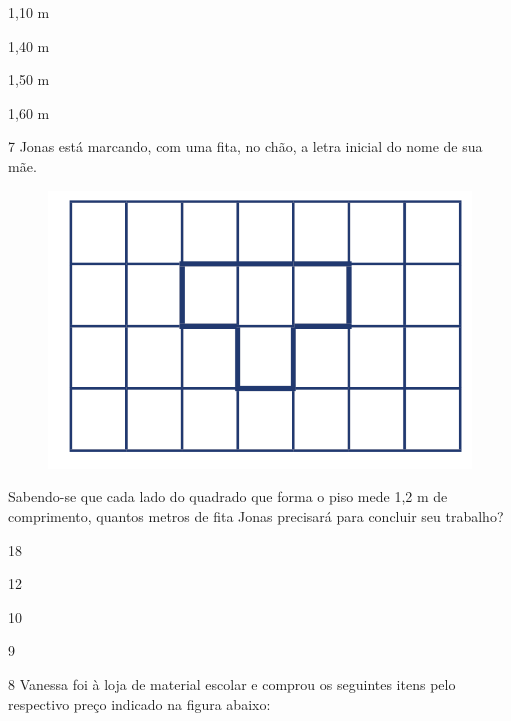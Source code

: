 \begin{minipage}{.5\textwidth}
\begin{escolha}
\item
  1,10 m
\item
  1,40 m
\item
  1,50 m
\item
  1,60 m
\end{escolha}
\end{minipage}


\num{7} Jonas está marcando, com uma fita, no chão, a letra inicial
do nome de sua mãe.

\begin{figure}[htpb!]
\centering
\includegraphics[width=.5\textwidth]{../ilustracoes/MAT5/SAEB_5ANO_MAT_figura118.png}
\end{figure}

\pagebreak
Sabendo-se que cada lado do quadrado que forma o piso mede 1,2 m de
comprimento, quantos metros de fita Jonas precisará para concluir seu
trabalho?

\begin{minipage}{.5\textwidth}
\begin{escolha}
\item
  18
\item
  12
\item
  10
\item
  9
\end{escolha}
\end{minipage}

\num{8} Vanessa foi à loja de material escolar e comprou os seguintes
itens pelo respectivo preço indicado na figura abaixo:

